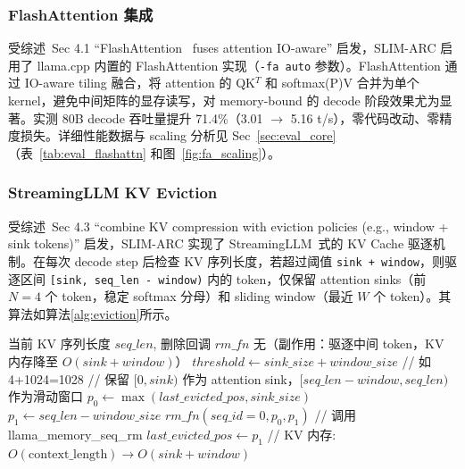 \subsubsection{FlashAttention 集成}

受综述~\cite{survey2026}Sec 4.1 “FlashAttention~\cite{flashattention2022} fuses attention IO-aware” 启发，SLIM-ARC 启用了 llama.cpp 内置的 FlashAttention 实现（\texttt{-fa auto} 参数）。FlashAttention 通过 IO-aware tiling 融合，将 attention 的 QK$^T$ 和 softmax(P)V 合并为单个 kernel，避免中间矩阵的显存读写，对 memory-bound 的 decode 阶段效果尤为显著。实测 80B decode 吞吐量提升 71.4\%（3.01 $\to$ 5.16 t/s），零代码改动、零精度损失。详细性能数据与 scaling 分析见 Sec~\ref{sec:eval_core}（表~\ref{tab:eval_flashattn} 和图~\ref{fig:fa_scaling}）。

\subsubsection{StreamingLLM KV Eviction}

受综述~\cite{survey2026}Sec 4.3 “combine KV compression with eviction policies (e.g., window + sink tokens)” 启发，SLIM-ARC 实现了 StreamingLLM~\cite{streamingllm2024}式的 KV Cache 驱逐机制。在每次 decode step 后检查 KV 序列长度，若超过阈值 \texttt{sink + window}，则驱逐区间 \texttt{[sink, seq\_len - window)} 内的 token，仅保留 attention sinks（前 $N=4$ 个 token，稳定 softmax 分母）和 sliding window（最近 $W$ 个 token）。其算法如算法\ref{alg:eviction}所示。

\begin{algorithm}[H]
    \caption{StreamingLLM KV Eviction}
    \label{alg:eviction}
    \renewcommand{\algorithmicrequire}{\textbf{输入:}}
    \renewcommand{\algorithmicensure}{\textbf{输出:}}
    \begin{algorithmic}[1]
        \REQUIRE 当前 KV 序列长度 $seq\_len$, 删除回调 $rm\_fn$
        \ENSURE 无（副作用：驱逐中间 token，KV 内存降至 $O(sink+window)$）
            \RETURN
        \ENDIF
        \STATE $threshold \gets sink\_size + window\_size$ // 如 4+1024=1028
            \RETURN
        \ENDIF
        \STATE // 保留 $[0, sink)$ 作为 attention sink，$[seq\_len - window, seq\_len)$ 作为滑动窗口
        \STATE $p_0 \gets \max(last\_evicted\_pos, sink\_size)$
        \STATE $p_1 \gets seq\_len - window\_size$
            \STATE $rm\_fn(seq\_id=0, p_0, p_1)$ // 调用 llama\_memory\_seq\_rm
            \STATE $last\_evicted\_pos \gets p_1$
            \STATE // KV 内存: $O(\text{context\_length}) \to O(sink + window)$
        \ENDIF
    \end{algorithmic}
\end{algorithm}

